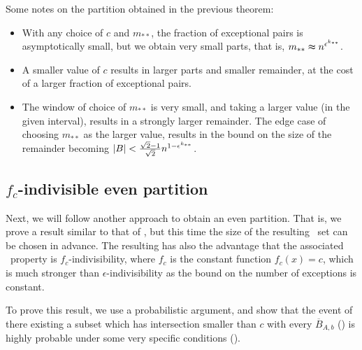         \begin{remark}
            Some notes on the partition obtained in the previous theorem:
            \begin{itemize}
                \item With any choice of $c$ and $m_{**}$, the fraction of exceptional pairs is asymptotically small,
                    but we obtain very small parts, that is, $m_{**} \thickapprox n^{\epsilon^{k_{**}}}$.
                \item A smaller value of $c$ results in larger parts and smaller remainder, at the cost of a larger fraction
                    of exceptional pairs.
                \item The window of choice of $m_{**}$ is very small, and taking a larger value
                    (in the given interval), results in a strongly larger remainder.
                    The edge case of choosing $m_{**}$ as the larger value, results in the bound on the size of the
                    remainder becoming $| B | < \frac{\sqrt{2}-1}{\sqrt{2}} n^{1-\epsilon^{k_{**}}}$.
            \end{itemize}
        \end{remark}

    \subsection{$f_c$-indivisible even partition} \label{subsec:subsection_4.3}

        Next, we will follow another approach to obtain an even partition.
        That is, we prove a result similar to that of , but this time the size of the resulting
        \regular~set can be chosen in advance.
        The resulting  has also the advantage that
        the associated \regular~property is $f_c$-indivisibility, where $f_c$ is the constant function $f_c(x) = c$, which
        is much stronger than $\epsilon$-indivisibility as the bound on the number of exceptions is constant.

        To prove this result, we use a probabilistic argument, and show that the event of there existing a subset which has
        intersection smaller than $c$ with every $\overline{B}_{A,b}$ () is highly
        probable under some very specific conditions ().

